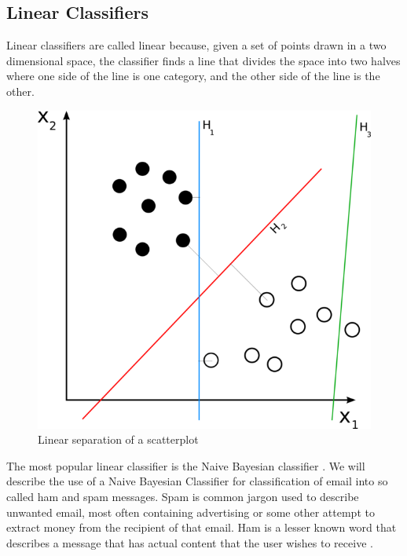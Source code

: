 \documentclass[12pt]{article}
\begin{document}
\subsection{Linear Classifiers}
Linear classifiers are called linear because, given a set of points drawn in a two dimensional space, the
classifier finds a line that divides the space into two halves where one side of the line is one category, and
the other side of the line is the other.\\
\begin{figure}[center]
  \centering
\includegraphics[scale=.4,natwidth=720,natheight=540]{svm_separating_hyperplanes.png}  
  \caption{Linear separation of a scatterplot}
\end{figure}

The most popular linear classifier is the Naive Bayesian classifier \citep{kononenko1991semi}.
We will describe the use of a Naive Bayesian Classifier for classification of email into so called ham and
spam messages. Spam is common jargon used to describe unwanted email, most often containing advertising or
some other attempt to extract money from the recipient of that email. Ham is a lesser known word that
describes a message that has actual content that the user wishes to receive \citep{nelson2008exploiting}.
\end{document}
